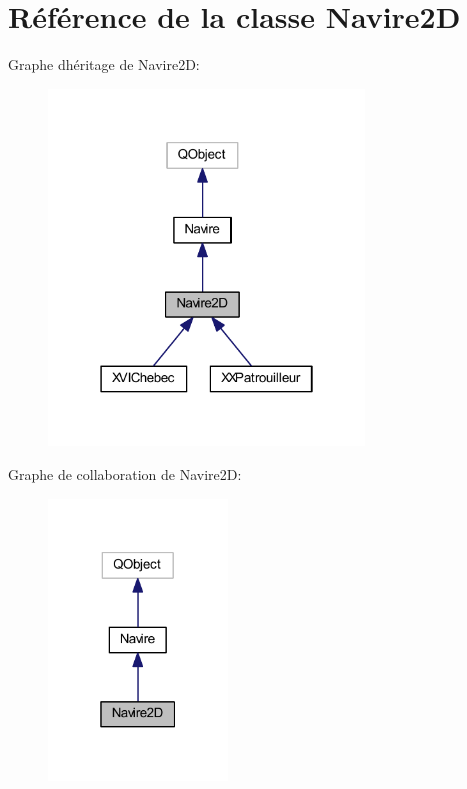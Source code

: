 \hypertarget{class_navire2_d}{}\section{Référence de la classe Navire2D}
\label{class_navire2_d}


Graphe d\textquotesingle{}héritage de Navire2D\+:
\nopagebreak
\begin{figure}[H]
\begin{center}
\leavevmode
\includegraphics[width=238pt]{class_navire2_d__inherit__graph}
\end{center}
\end{figure}


Graphe de collaboration de Navire2D\+:
\nopagebreak
\begin{figure}[H]
\begin{center}
\leavevmode
\includegraphics[width=135pt]{class_navire2_d__coll__graph}
\end{center}
\end{figure}
